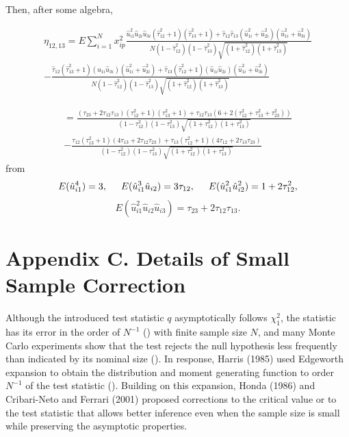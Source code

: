 \documentclass[aap,authoryear, preprint]{imsart}
\numberwithin{equation}{section}
\theoremstyle{plain}
\begin{document}
 Then, after some algebra,

\begin{equation}
    \begin{multlined}
    \eta_{12,13} = E\sum_{i=1}^{N}x_{ip}^2  \frac{\hat{u}_{i1}^2 \hat{u}_{2i}\hat{u}_{3i}(\hat{\tau}_{12}^2+1)(\hat{\tau}_{13}^2+1)
    + \hat{\tau}_{12}\hat{\tau}_{13} (\hat{u}_{1i}^2 + \hat{u}_{2i}^2)(\hat{u}_{1i}^2 + \hat{u}_{3i}^2)}{N(1-\hat{\tau}_{12}^2)(1-\hat{\tau}_{13}^2)\sqrt{(1+\hat{\tau}_{12}^2)(1+\hat{\tau}_{13}^2)}} \\
    - \frac{\hat{\tau}_{12}(\hat{\tau}_{13}^2 + 1) (\hat{u}_{1i}\hat{u}_{3i})(\hat{u}_{1i}^2 + \hat{u}_{2i}^2) + \hat{\tau}_{13}(\hat{\tau}_{12}^2+1)(\hat{u}_{1i}\hat{u}_{2i})(\hat{u}_{1i}^2 + \hat{u}_{3i}^2)}{N(1-\hat{\tau}_{12}^2)(1-\hat{\tau}_{13}^2)\sqrt{(1+\hat{\tau}_{12}^2)(1+\hat{\tau}_{13}^2)}}
    \end{multlined} 
    \end{equation}
    
\begin{equation} \begin{multlined}
= \frac{(\tau_{23}+2\tau_{12}\tau_{13})(\tau_{12}^2+1)(\tau_{13}^2+1) + \tau_{12}\tau_{13}(6+2(\tau_{12}^2+\tau_{13}^2+\tau_{23}^2))}{(1-{\tau}_{12}^2)(1-{\tau}_{13}^2)\sqrt{(1+{\tau}_{12}^2)(1+{\tau}_{13}^2)}} \\
- \frac{\tau_{12}(\tau_{13}^2+1)(4\tau_{13}+2\tau_{12}\tau_{23}) + \tau_{13}(\tau_{12}^2+1)(4\tau_{12}+2\tau_{13}\tau_{23})}{(1-{\tau}_{12}^2)(1-{\tau}_{13}^2)\sqrt{(1+{\tau}_{12}^2)(1+{\tau}_{13}^2)}}
\end{multlined} \end{equation}
from
$$E(\hat{u}_{i1}^4) = 3, \hspace{5mm} E(\hat{u}_{i1}^3 \hat{u}_{i2}) = 3\tau_{12}, \hspace{5mm} E(\hat{u}_{i1}^2\hat{u}_{i2}^2) = 1 + 2\tau_{12}^2,$$
$$E(\hat{u}_{i1}^2 \hat{u}_{i2} \hat{u}_{i3}) = \tau_{23} + 2\tau_{12}\tau_{13}.$$

\section*{Appendix C. Details of Small Sample Correction}
Although the introduced test statistic $q$ asymptotically follows $\chi_1^2$, the statistic has its error in the order of $N^{-1}$ (\cite{harris1985asymptotic}) with finite sample size $N$, and many Monte Carlo experiments show that the test rejects the null hypothesis less frequently than indicated by its nominal size (\cite{godfrey1978testing, griffiths1986monte, honda1988size}). In response, Harris (1985) used Edgeworth expansion to obtain the distribution and moment generating function to order $N^{-1}$ of the test statistic (\cite{harris1985asymptotic}). Building on this expansion, Honda (1986) and Cribari-Neto and Ferrari (2001) proposed corrections to the critical value or to the test statistic that allows better inference even when the sample size is small while preserving the asymptotic properties.\\
\end{document}
